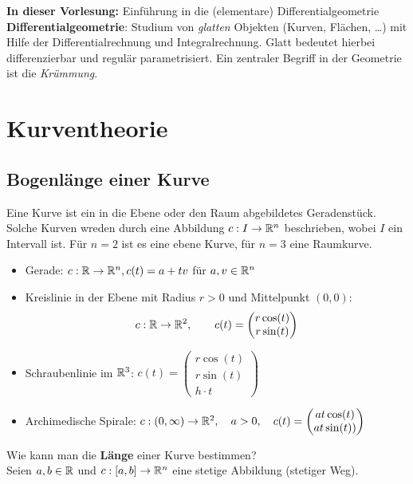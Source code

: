 \documentclass[11pt]{scrbook}
\begin{document}
\textbf{In dieser Vorlesung:} Einführung in die (elementare) Differentialgeometrie \\
\textbf{Differentialgeometrie}: Studium von \emph{glatten} Objekten (Kurven, Flächen, \dots) mit Hilfe der Differentialrechnung und Integralrechnung.
Glatt bedeutet hierbei differenzierbar und regulär parametrisiert.
Ein zentraler Begriff in der Geometrie ist die \emph{Krümmung}.

\newpage


\chapter{Kurventheorie}

\section{Bogenlänge einer Kurve}

Eine Kurve ist ein in die Ebene oder den Raum abgebildetes Geradenstück. Solche Kurven wreden durch eine Abbildung $c: I \to \mathbb{R}^n$ beschrieben, wobei  $I$ ein Intervall ist. Für $n = 2$ ist es eine ebene Kurve, für $n = 3$ eine Raumkurve.

\begin{ex}
\label{1.1}
\begin{itemize}
	\item Gerade: $ c: \mathbb{R} \to \mathbb{R}^n , c(t) = a + t v $ für $ a, v \in \mathbb{R}^n$
	\item Kreislinie in der Ebene mit Radius $ r > 0$ und Mittelpunkt $(0,0)$: \[ c: \mathbb{R} \to \mathbb{R}^2, \qquad c(t) = \begin{pmatrix} r \cos(t) \\  r \sin(t) \end{pmatrix} \]
	\item Schraubenlinie im $\mathbb{R}^3$: $c(t) = \begin{pmatrix} r \cos(t) \\ r \sin(t) \\  h \cdot t \end{pmatrix}$
	\item Archimedische Spirale: $ c: (0,\infty) \to \mathbb{R}^2 , \quad a > 0, \quad c(t) = \begin{pmatrix} a  t  \cos(t) \\ a  t  \sin(t)) \end{pmatrix}$
\end{itemize}
\end{ex}

Wie kann man die \textbf{Länge} einer Kurve bestimmen? \\
Seien $a,b \in \mathbb{R}$ und $c: [a,b] \to \mathbb{R}^n$ eine stetige Abbildung (\glqq stetiger Weg\grqq). \\
\end{document}
